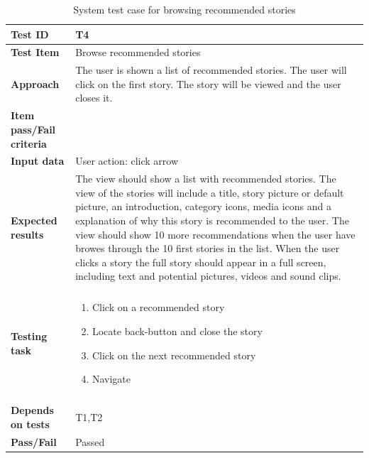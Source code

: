 \begin{appendices}
	\begin{table}[H]
		\small
		\centering
		\caption{System test case for browsing recommended stories}
		\begin{tabular}{ | l | l  |}
			\hline
			\hline
			\textbf{Test ID} & T4  \\ \hline
			\textbf{Test Item} & Browse recommended stories \\ \hline
			\textbf{Approach} & \begin{minipage}{5in}The user is shown a list of recommended stories. The user will click on the first story. The story will be viewed and the user closes it. 
			\end{minipage}\\ \hline
			\textbf{Item pass/Fail criteria} &  \\ \hline			
			\textbf{Input data} &  User action: click arrow\\ \hline
			\textbf{Expected results} & \begin{minipage}{5in}The view should show a list with recommended stories. The view of the stories will include a title, story picture or default picture, an introduction, category icons, media icons and a explanation of why this story is recommended to the user.  The view should show 10 more recommendations when the user have browes through the 10 first stories in the list.
			When the user clicks a story the full story should appear in a full screen, including text and potential pictures, videos and sound clips.   \end{minipage}\\ \hline&\\[-3.8ex]
			\textbf{Testing task} & \begin{minipage}{5in}
			\begin{enumerate}[noitemsep]
			\item Click on a recommended story
			\item Locate back-button and close the story
			\item Click on the next recommended story
			\item Navigate 
			\end{enumerate}\end{minipage}
			\\ &\\[-3.8ex]\hline
			\textbf{Depends on tests} & T1,T2 \\ \hline		
			\textbf{Pass/Fail} & Passed \\\hline			
		\end{tabular}
	

\end{table}
\end{appendices}
